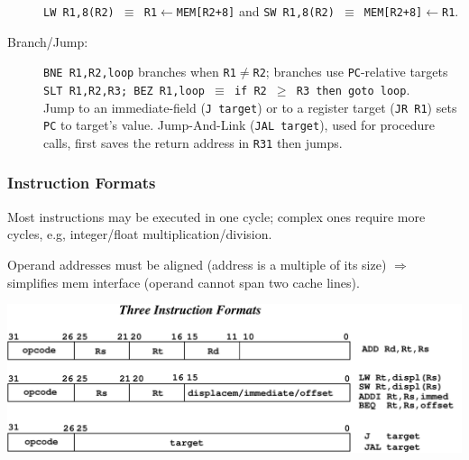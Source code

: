 \documentclass{beamer}
\begin{document}
\begin{frame}[fragile,t]
\begin{scriptsize}
\begin{description}
                        {\tt LW R1,8(R2) $\equiv$ R1$\leftarrow$MEM[R2+8]} and
                        {\tt SW R1,8(R2) $\equiv$ MEM[R2+8]$\leftarrow$R1}.\smallskip
\item[Branch/Jump:]   %
                      {\tt BNE R1,R2,loop} branches when {\tt R1$\neq$R2}; branches 
                        use {\tt PC}-relative targets\\ 
                        {\tt SLT R1,R2,R3; BEZ R1,loop $\equiv$ if R2 $\geq$ R3 then goto loop}.\\
                      Jump to an immediate-field ({\tt J target}) or to a register target 
                        ({\tt JR R1}) sets {\tt PC} to target's value.  
                      Jump-And-Link ({\tt JAL target}), used for procedure calls,
                        first saves the return address in {\tt R31} then jumps.
\end  {description}
\end{scriptsize}
\end{frame}


\begin{frame}[fragile,t]
\frametitle{Instruction Formats}

Most instructions may be executed in one cycle; complex ones require more cycles,
e.g, integer/float multiplication/division.\smallskip

Operand addresses must be aligned (address is a multiple of its size)
$\Rightarrow$ simplifies mem interface (operand cannot span two cache lines).

\bigskip

\includegraphics[width=70ex]{Figures/InstrFormats}

\end{frame}
\end{document}
